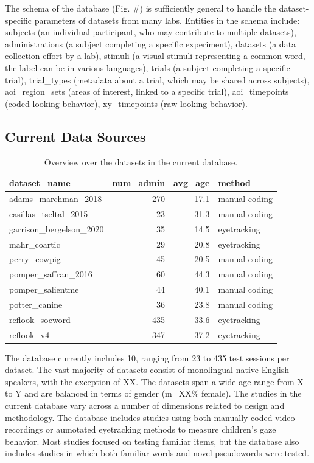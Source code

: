 \documentclass[10pt, letterpaper]{article}
\begin{document}
The schema of the database (Fig. \#) is sufficiently general to handle
the dataset-specific parameters of datasets from many labs. Entities in
the schema include: subjects (an individual participant, who may
contribute to multiple datasets), administrations (a subject completing
a specific experiment), datasets (a data collection effort by a lab),
stimuli (a visual stimuli representing a common word, the label can be
in various languages), trials (a subject completing a specific trial),
trial\_types (metadata about a trial, which may be shared across
subjects), aoi\_region\_sets (areas of interest, linked to a specific
trial), aoi\_timepoints (coded looking behavior), xy\_timepoints (raw
looking behavior).

\hypertarget{current-data-sources}{%
\subsection{Current Data Sources}\label{current-data-sources}}

\begin{table}[H]
\centering
\begingroup\fontsize{9pt}{10pt}\selectfont
\begin{tabular}{lrrl}
  \hline
dataset\_name & num\_admin & avg\_age & method \\ 
  \hline
adams\_marchman\_2018 & 270 & 17.1 & manual coding \\ 
  casillas\_tseltal\_2015 & 23 & 31.3 & manual coding \\ 
  garrison\_bergelson\_2020 & 35 & 14.5 & eyetracking \\ 
  mahr\_coartic & 29 & 20.8 & eyetracking \\ 
  perry\_cowpig & 45 & 20.5 & manual coding \\ 
  pomper\_saffran\_2016 & 60 & 44.3 & manual coding \\ 
  pomper\_salientme & 44 & 40.1 & manual coding \\ 
  potter\_canine & 36 & 23.8 & manual coding \\ 
  reflook\_socword & 435 & 33.6 & eyetracking \\ 
  reflook\_v4 & 347 & 37.2 & eyetracking \\ 
   \hline
\end{tabular}
\endgroup
\caption{Overview over the datasets in the current database.} 
\end{table}

The database currently includes 10, ranging from 23 to 435 test sessions
per dataset. The vast majority of datasets consist of monolingual native
English speakers, with the exception of XX. The datasets span a wide age
range from X to Y and are balanced in terms of gender (m=XX\% female).
The studies in the current database vary across a number of dimensions
related to design and methodology. The database includes studies using
both manually coded video recordings or aumotated eyetracking methods to
measure children's gaze behavior. Most studies focused on testing
familiar items, but the database also includes studies in which both
familiar words and novel pseudowords were tested.
\end{document}
